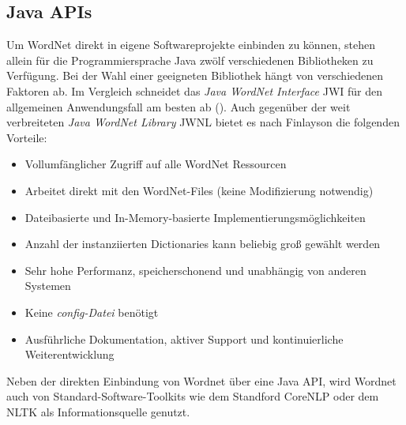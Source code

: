 \subsection{Java APIs}

Um WordNet direkt in eigene Softwareprojekte einbinden zu können, stehen allein für die Programmiersprache Java zwölf verschiedenen Bibliotheken zu Verfügung. Bei der Wahl einer geeigneten Bibliothek hängt von verschiedenen Faktoren ab. Im Vergleich schneidet das \textit{Java WordNet Interface} \ac{JWI} für den allgemeinen Anwendungsfall am besten ab (\cite[vgl.][2]{FINLAYSON}). Auch gegenüber der weit verbreiteten \textit{Java WordNet Library} \ac{JWNL} bietet es nach Finlayson die folgenden Vorteile:

\begin{itemize} 
\item Vollumfänglicher Zugriff auf alle WordNet Ressourcen
\item Arbeitet direkt mit den WordNet-Files (keine Modifizierung notwendig)
\item Dateibasierte und In-Memory-basierte Implementierungsmöglichkeiten
\item Anzahl der instanziierten Dictionaries kann beliebig groß gewählt werden
\item Sehr hohe Performanz, speicherschonend und unabhängig von anderen Systemen
\item Keine \textit{config-Datei} benötigt 
\item Ausführliche Dokumentation, aktiver Support und kontinuierliche Weiterentwicklung
\end{itemize}

Neben der direkten Einbindung von Wordnet über eine Java API, wird Wordnet auch von Standard-Software-Toolkits wie dem Standford CoreNLP oder dem NLTK als Informationsquelle genutzt.
